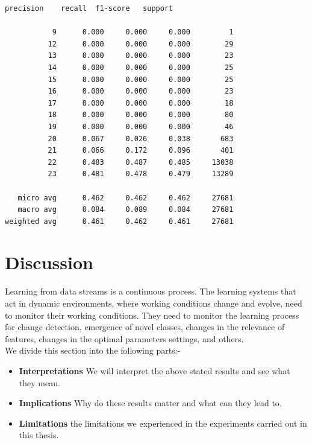\begin{lstlisting}[caption=Statistics for various orderings]
             precision    recall  f1-score   support

           9      0.000     0.000     0.000         1
          12      0.000     0.000     0.000        29
          13      0.000     0.000     0.000        23
          14      0.000     0.000     0.000        25
          15      0.000     0.000     0.000        25
          16      0.000     0.000     0.000        23
          17      0.000     0.000     0.000        18
          18      0.000     0.000     0.000        80
          19      0.000     0.000     0.000        46
          20      0.067     0.026     0.038       683
          21      0.066     0.172     0.096       401
          22      0.483     0.487     0.485     13038
          23      0.481     0.478     0.479     13289

   micro avg      0.462     0.462     0.462     27681
   macro avg      0.084     0.089     0.084     27681
weighted avg      0.461     0.462     0.461     27681
\end{lstlisting}

\section{Discussion}
\cite{DNN_for_stream} Learning from data streams is a continuous process. The learning systems that act in dynamic environments, where working conditions change and evolve, need to monitor their working conditions. They need to monitor the learning process  for change detection, emergence of novel classes, changes in the relevance of features, changes in the optimal parameters  settings, and others.\\
We divide this section into the following parts:-
\begin{itemize}
    \item \textbf{Interpretations} We will interpret the above stated results and see what they mean.
    \item \textbf{Implications} Why do these results matter and what can they lead to.
    \item \textbf{Limitations} the limitations we experienced in the experiments carried out in this thesis.
\end{itemize}


